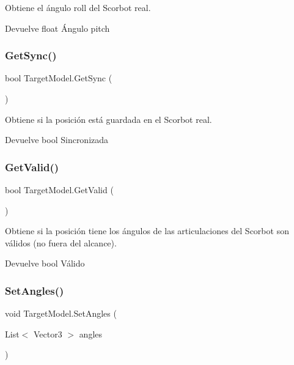Obtiene el ángulo roll del Scorbot real. \begin{DoxyReturn}{Devuelve}
float Ángulo pitch 
\end{DoxyReturn}
\mbox{\label{class_target_model_a6cb8e2993f269328e380670f9b545b80}} 
\subsubsection{\texorpdfstring{GetSync()}{GetSync()}}
{\footnotesize\ttfamily bool Target\+Model.\+Get\+Sync (\begin{DoxyParamCaption}{ }\end{DoxyParamCaption})\hspace{0.3cm}{\ttfamily [inline]}}

Obtiene si la posición está guardada en el Scorbot real. \begin{DoxyReturn}{Devuelve}
bool Sincronizada 
\end{DoxyReturn}
\mbox{\label{class_target_model_a9bb012f5488eb24605440467601f3dfc}} 
\subsubsection{\texorpdfstring{GetValid()}{GetValid()}}
{\footnotesize\ttfamily bool Target\+Model.\+Get\+Valid (\begin{DoxyParamCaption}{ }\end{DoxyParamCaption})\hspace{0.3cm}{\ttfamily [inline]}}

Obtiene si la posición tiene los ángulos de las articulaciones del Scorbot son válidos (no fuera del alcance). \begin{DoxyReturn}{Devuelve}
bool Válido 
\end{DoxyReturn}
\mbox{\label{class_target_model_a36babf52c1f4e545e7db883cb66fbce5}} 
\subsubsection{\texorpdfstring{SetAngles()}{SetAngles()}}
{\footnotesize\ttfamily void Target\+Model.\+Set\+Angles (\begin{DoxyParamCaption}\item[{List$<$ Vector3 $>$}]{angles }\end{DoxyParamCaption})\hspace{0.3cm}{\ttfamily [inline]}}

